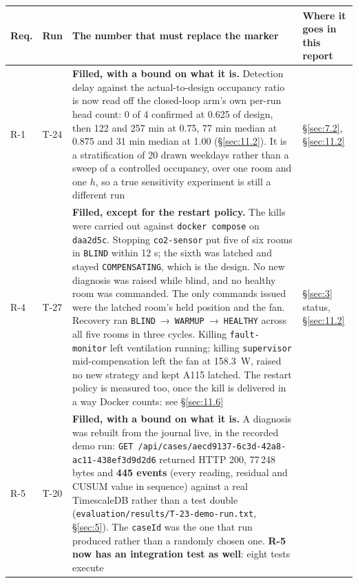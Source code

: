 \begin{longtable}[]{@{}
  >{\raggedright\arraybackslash}p{}
  >{\raggedright\arraybackslash}p{}
  >{\raggedright\arraybackslash}p{}
  >{\raggedright\arraybackslash}p{}@{}}
\toprule
\textbf{Req.} & \textbf{Run} & \textbf{The number that must replace the marker} &
\textbf{Where it goes in this report} \\
\midrule
\endhead
R-1 & T-24 & \textbf{Filled, with a bound on what it is.} Detection delay against the
actual-to-design occupancy ratio is now read off the closed-loop arm's own per-run head count:
0 of 4 confirmed at 0.625 of design, then 122 and 257 min at 0.75, 77 min median at 0.875 and
31 min median at 1.00 (§\ref{sec:11.2}). It is a stratification of 20 drawn weekdays rather than a sweep of
a controlled occupancy, over one room and one $h$, so a true sensitivity experiment is still a
different run & §\ref{sec:7.2}, §\ref{sec:11.2} \\
R-4 & T-27 & \textbf{Filled, except for the restart policy.} The kills were carried out against
\texttt{docker compose} on \texttt{daa2d5c}. Stopping \texttt{co2-sensor} put five of six rooms in
\texttt{BLIND} within 12 s; the sixth was latched and stayed \texttt{COMPENSATING}, which is the
design. No new diagnosis was raised while blind, and no healthy room was commanded. The only
commands issued were the latched room's held position and the fan. Recovery ran
\texttt{BLIND}~→~\texttt{WARMUP}~→~\texttt{HEALTHY} across all five rooms in three cycles.
Killing \texttt{fault-monitor} left ventilation running; killing \texttt{supervisor} mid-compensation
left the fan at 158.3~W, raised no new strategy and kept A115 latched. The restart policy is
measured too, once the kill is delivered in a way Docker counts: see §\ref{sec:11.6} & §\ref{sec:3} status, §\ref{sec:11.2} \\
R-5 & T-20 & \textbf{Filled, with a bound on what it is.} A diagnosis was rebuilt from the journal
live, in the recorded demo run: \texttt{GET /api/cases/aecd9137-\allowbreak 6c3d-\allowbreak 42a8-\allowbreak ac11-\allowbreak 438ef3d9d2d6}
returned HTTP 200, 77\,248 bytes and \textbf{445 events} (every reading, residual and CUSUM value
in sequence) against a real TimescaleDB rather than a test double
(\texttt{evaluation/results/T-23-demo-run.txt}, §\ref{sec:5}). The \texttt{caseId} was the one that run produced rather than a
randomly chosen one. \textbf{R-5 now has an integration test as well}: eight tests execute

\end{longtable}
